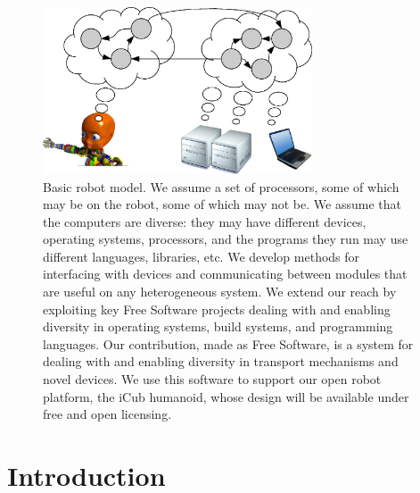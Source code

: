 

\begin{figure}
\centerline{
\includegraphics[width=8cm]{fig-nethead}
}
\caption{
%
Basic robot model.  We assume a set of processors, some of which may be
on the robot, some of which may not be.  We assume that the computers
are diverse: they may have different devices, operating systems,
processors, and the programs they run may use different languages,
libraries, etc.  
%
We develop methods for interfacing with devices and communicating
between modules that are useful on any heterogeneous system.
%
We extend our reach by exploiting key Free Software projects
dealing with and enabling diversity in operating systems, build systems, 
and programming languages.
%
Our contribution, made as Free Software, is a system for dealing
with and enabling diversity in transport mechanisms and novel devices.
%
%
%
We use this software to support our open robot platform, the iCub
humanoid, whose design will be available under free and open
licensing.
%
}
\end{figure}


\section{Introduction}




